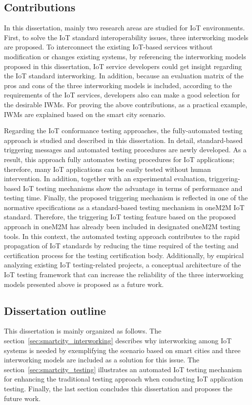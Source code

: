 \subsection{Contributions}
In this dissertation, mainly two research areas are studied for IoT environments. First, to solve the IoT standard interoperability issues, three interworking models are proposed. To interconnect the existing IoT-based services without modification or changes existing systems, by referencing the interworking models proposed in this dissertation, IoT service developers could get insight regarding the IoT standard interworking. In addition, because an evaluation matrix of the pros and cons of the three interworking models is included, according to the requirements of the IoT services, developers also can make a good selection for the desirable IWMs. For proving the above contributions, as a practical example, IWMs are explained based on the smart city scenario.

Regarding the IoT conformance testing approaches, the fully-automated testing approach is studied and described in this dissertation. In detail, standard-based triggering messages and automated testing procedures are newly developed. As a result, this approach fully automates testing procedures for IoT applications; therefore, many IoT applications can be easily tested without human intervention. In addition, together with an experimental evaluation, triggering-based IoT testing mechanisms show the advantage in terms of performance and testing time. Finally, the proposed triggering mechanism is reflected in one of the normative specifications as a standard-based testing mechanism in oneM2M IoT standard. Therefore, the triggering IoT testing feature based on the proposed approach in oneM2M has already been included in designated oneM2M testing tools. In this context, the automated testing approach contributes to the rapid propagation of IoT standards by reducing the time required of the testing and certification process for the testing certification body. Additionally, by empirical analyzing existing IoT testing-related projects, a conceptual architecture of the IoT testing framework that can increase the reliability of the three interworking models presented above is proposed as a future work.

\subsection{Dissertation outline}
This dissertation is mainly organized as follows. The section~\ref{sec:smartcity_interworking} describes why interworking among IoT systems is needed by exemplifying the scenario based on smart cities and three interworking models are included as a solution for this issue. The section~\ref{sec:smartcity_testing} illustrates an automated IoT testing mechanism for enhancing the traditional testing approach when conducting IoT application testing. Finally, the last section concludes this dissertation and proposes the future work.

\clearpage